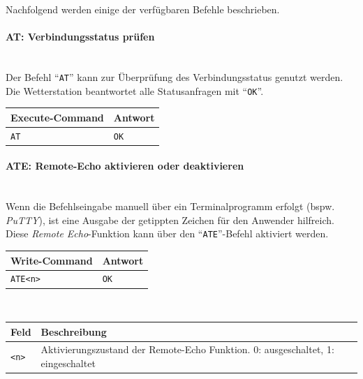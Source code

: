         Nachfolgend werden einige der verfügbaren Befehle beschrieben.
        
        \paragraph{AT: Verbindungsstatus prüfen}\mbox{}\\
        Der Befehl ``\texttt{AT}'' kann zur Überprüfung des Verbindungsstatus genutzt werden. Die Wetterstation beantwortet alle Statusanfragen mit ``\texttt{OK}''.
        
        \begin{table}[H]
            \centering
            \begin{tabular}{|p{}|p{}|}
                \hline
                \textbf{Execute-Command} &\textbf{Antwort} \\
                \hline
                \texttt{AT} & \texttt{OK}\\
                \hline
            \end{tabular}
        \end{table}
    
        \paragraph{ATE: Remote-Echo aktivieren oder deaktivieren}\mbox{}\\
        Wenn die Befehlseingabe manuell über ein Terminalprogramm erfolgt (bspw. \emph{PuTTY}), ist eine Ausgabe der getippten Zeichen für den Anwender hilfreich. Diese \emph{Remote Echo}-Funktion kann über den ``\texttt{ATE}''-Befehl aktiviert werden.
        
        \begin{table}[H]
            \centering
            \begin{tabular}{|p{}|p{}|}
                \hline
                \textbf{Write-Command} &\textbf{Antwort} \\
                \hline
                \texttt{ATE<n>} & \texttt{OK}\\
                \hline
            \end{tabular}\\[3mm]
            \begin{tabular}{|p{}|p{}|}
                \hline
                \textbf{Feld}       & \textbf{Beschreibung}\\
                \hline
                \texttt{<n>}      & Aktivierungszustand der Remote-Echo Funktion. 0: ausgeschaltet, 1: eingeschaltet \\
                \hline
            \end{tabular}
        \end{table}
    
